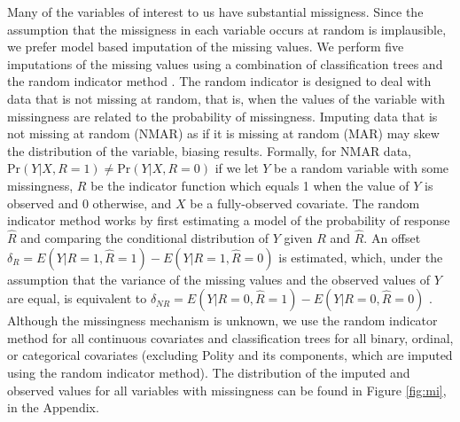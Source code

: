 \documentclass[12pt]{article}
\begin{document}
Many of the variables of interest to us have substantial missigness. Since the assumption that the missigness in each variable occurs at random is implausible, we prefer model based imputation of the missing values. We perform five imputations of the missing values using a combination of classification trees and the random indicator method \citep{buuren2011mice,jolani2012}. The random indicator is designed to deal with data that is not missing at random, that is, when the values of the variable with missingness are related to the probability of missingness. Imputing data that is not missing at random (NMAR) as if it is missing at random (MAR) may skew the distribution of the variable, biasing results. Formally, for NMAR data, $\text{Pr}(Y|X, R=1) \neq \text{Pr}(Y|X, R=0)$ if we let $Y$ be a random variable with some missingness, $R$ be the indicator function which equals 1 when the value of $Y$ is observed and 0 otherwise, and $X$ be a fully-observed covariate. The random indicator method works by first estimating a model of the probability of response $\hat{R}$ and comparing the conditional distribution of $Y$ given $R$ and $\hat{R}$. An offset $\delta_R = E(Y|R=1,\hat{R}=1) - E(Y|R=1,\hat{R}=0)$ is estimated, which, under the assumption that the variance of the missing values and the observed values of $Y$ are equal, is equivalent to $\delta_{NR} = E(Y|R=0,\hat{R}=1) - E(Y|R=0,\hat{R}=0)$ \citep{jolani2012}. Although the missingness mechanism is unknown, we use the random indicator method for all continuous covariates and classification trees for all binary, ordinal, or categorical covariates (excluding Polity and its components, which are imputed using the random indicator method). The distribution of the imputed and observed values for all variables with missingness can be found in Figure \ref{fig:mi}, in the Appendix.
\end{document}
